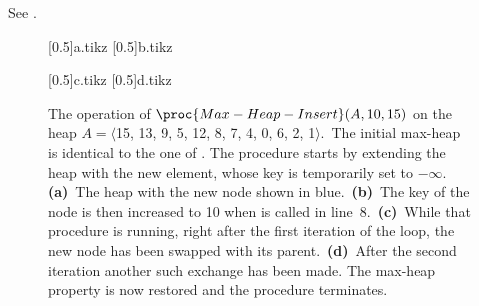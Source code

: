 See .
\begin{figure}[htb]
    \subcaptionbox{\label{fig:6.5-2a}}[0.5\textwidth]{{a.tikz}}
    \subcaptionbox{\label{fig:6.5-2b}}[0.5\textwidth]{{b.tikz}}
    \par\vspace{1.5\vertexsize}
    \subcaptionbox{\label{fig:6.5-2c}}[0.5\textwidth]{{c.tikz}}
    \subcaptionbox{\label{fig:6.5-2d}}[0.5\textwidth]{{d.tikz}}
    \caption{The operation of $\proc{Max-Heap-Insert}(A,10,15)$ on the heap $A=\langle$15, 13, 9, 5, 12, 8, 7, 4, 0, 6, 2, 1$\rangle$.\,
    The initial max-heap is identical to the one of .
    The procedure starts by extending the heap with the new element, whose key is temporarily set to $-\infty$.
    \textbf{(a)}\, The heap with the new node shown in blue.\,
    \textbf{(b)}\, The key of the node is then increased to 10 when  is called in line~8.\,
    \textbf{(c)}\, While that procedure is running, right after the first iteration of the  loop, the new node has been swapped with its parent.\,
    \textbf{(d)}\, After the second iteration another such exchange has been made.
    The max-heap property is now restored and the procedure terminates.} \label{fig:6.5-2}
\end{figure}

